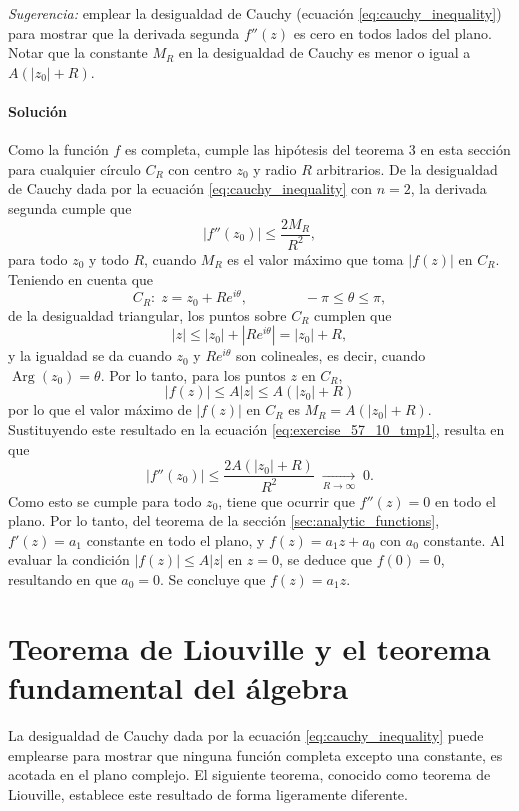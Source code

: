 \documentclass[a4paper]{report}
\DeclareMathOperator{\Arg}{Arg}
\begin{document}
\emph{Sugerencia:} emplear la desigualdad de Cauchy (ecuación \ref{eq:cauchy_inequality}) para mostrar que la derivada segunda \(f''(z)\) es cero en todos lados del plano. Notar que la constante \(M_R\) en la desigualdad de Cauchy es menor o igual a \(A(|z_0|+R)\).

\paragraph{Solución} Como la función \(f\) es completa, cumple las hipótesis del teorema 3 en esta sección para cualquier círculo \(C_R\) con centro \(z_0\) y radio \(R\) arbitrarios. De la desigualdad de Cauchy dada por la ecuación \ref{eq:cauchy_inequality} con \(n=2\), la derivada segunda cumple que 
\begin{equation}\label{eq:exercise_57_10_tmp1}
 |f''(z_0)|\leq\frac{2M_R}{R^2}, 
\end{equation}
para todo \(z_0\) y todo \(R\), cuando \(M_R\) es el valor máximo que toma \(|f(z)|\) en \(C_R\). Teniendo en cuenta que 
\[
 C_R:\;z=z_0+Re^{i\theta},
 \qquad\qquad 
 -\pi\leq\theta\leq\pi,
\]
de la desigualdad triangular, los puntos sobre \(C_R\) cumplen que 
\[
 |z|\leq|z_0|+|Re^{i\theta}|=|z_0|+R,
\]
y la igualdad se da cuando \(z_0\) y \(Re^{i\theta}\) son colineales, es decir, cuando \(\Arg(z_0)=\theta\). Por lo tanto, para los puntos \(z\)  en \(C_R\),
\[
 |f(z)|\leq A|z|\leq A(|z_0|+R)
\]
por lo que el valor máximo de \(|f(z)|\) en \(C_R\) es \(M_R=A(|z_0|+R)\). Sustituyendo este resultado en la ecuación \ref{eq:exercise_57_10_tmp1}, resulta en que 
\[
 |f''(z_0)|\leq\frac{2A(|z_0|+R)}{R^2}\;\xrightarrow[R\to\infty]{}\;0.
\]
Como esto se cumple para todo \(z_0\), tiene que ocurrir que \(f''(z)=0\) en todo el plano. Por lo tanto, del teorema de la sección \ref{sec:analytic_functions}, \(f'(z)=a_1\) constante en todo el plano, y \(f(z)=a_1z+a_0\) con \(a_0\) constante. Al evaluar la condición \(|f(z)|\leq A|z|\) en \(z=0\), se deduce que \(f(0)=0\), resultando en que \(a_0=0\). Se concluye que \(f(z)=a_1z\).

\section{Teorema de Liouville y el teorema fundamental del álgebra}\label{sec:liouville_theorem}

La desigualdad de Cauchy dada por la ecuación \ref{eq:cauchy_inequality} puede emplearse para mostrar que ninguna función completa excepto una constante, es acotada en el plano complejo. El siguiente teorema, conocido como teorema de Liouville, establece este resultado de forma ligeramente diferente.
\end{document}
